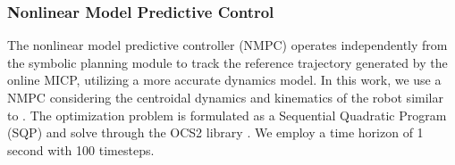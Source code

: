 \documentclass[letterpaper, 10 pt, conference]{ieeeconf}
\begin{document}
\subsubsection{Nonlinear Model Predictive Control}\label{subsec:nmpc}
The nonlinear model predictive controller (NMPC) operates independently from the symbolic planning module to track the reference trajectory generated by the online MICP, utilizing a more accurate dynamics model. In this work, we use a NMPC considering the centroidal dynamics and kinematics of the robot similar to \cite{dai2014whole,sleiman2021unified}. The optimization problem is formulated as a Sequential Quadratic Program (SQP) and solve through
the OCS2 library \cite{OCS2}. We employ a time horizon of 1 second with 100 timesteps.



\end{document}

